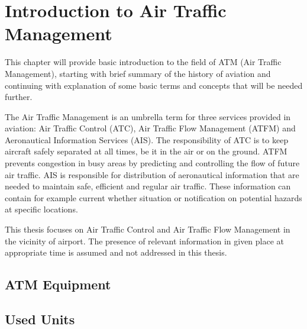 \chapter{Introduction to Air Traffic Management}

This chapter will provide basic introduction to the field of ATM (Air Traffic Management), starting with brief summary of the history of aviation and continuing with explanation of some basic terms and concepts that will be needed further.

The Air Traffic Management is an umbrella term for three services provided in aviation: Air Traffic Control (ATC), Air Traffic Flow Management (ATFM) and Aeronautical Information Services (AIS). The responsibility of ATC is to keep aircraft safely separated at all times, be it in the air or on the ground. ATFM prevents congestion in busy areas by predicting and controlling the flow of future air traffic. AIS is responsible for distribution of aeronautical information that are needed to maintain safe, efficient and regular air traffic. These information can contain for example current whether situation or notification on potential hazards at specific locations. \cite{atm}

This thesis focuses on Air Traffic Control and Air Traffic Flow Management in the vicinity of airport. The presence of relevant information in given place at appropriate time is assumed and not addressed in this thesis.




\section{ATM Equipment}









\section{Used Units}
